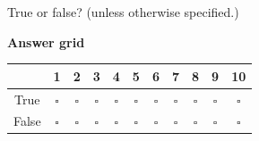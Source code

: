 \documentclass[a4paper]{article}
\begin{document}
\pagestyle{empty}
\thispagestyle{fancy}

True or false? (unless otherwise specified.)

\begin{center}
    \textbf{Answer grid}\par\smallskip

    \smallskip
    \normalsize
    \renewcommand{\arraystretch}{1.35}
    \begin{tabular}{|c|*{10}{c|}}
        \hline
        & 1 & 2 & 3 & 4 & 5 & 6 & 7 & 8 & 9 & 10 \\
        \hline
        True  & $\square$ & $\square$ & $\square$ & $\square$ & $\square$ & $\square$ & $\square$ & $\square$ & $\square$ & $\square$ \\
        False & $\square$ & $\square$ & $\square$ & $\square$ & $\square$ & $\square$ & $\square$ & $\square$ & $\square$ & $\square$ \\
        \hline
    \end{tabular}
\end{center}
\end{document}
